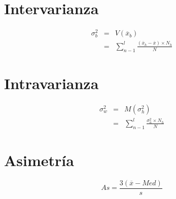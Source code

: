     \begin{minipage}[b]{\textwidth}
    \begin{minipage}[b]{0.5 \textwidth}
\section{Intervarianza}
    \begin{eqnarray*}
 { \sigma  }_{ b }^{ 2 } & = & V\left( \overline { x } _{ b } \right) \\
                         & = & \sum _{ n-1 }^{ l }{ \frac { \left( \overline { x } _{ h }-\overline { x }  \right) \times { N_{ h } } }{ N }  } 
\end{eqnarray*}
    
    \end{minipage} \hfill 
    \begin{minipage}[b]{0.5 \textwidth}

\section{Intravarianza} 
    \begin{eqnarray*}
 { \sigma  }_{ w }^{ 2 } & = & M\left( { \sigma  }_{ h }^{ 2 } \right)  \\
                         & = & \sum _{ n-1 }^{ l }{ \frac { { \sigma  }_{ n }^{ 2 }\times { N_{ h } } }{ N }  }  
\end{eqnarray*}
    
    \end{minipage}
    \end{minipage}
    
\section{Asimetría}
$$ As=\frac { 3\left( \overline { x } - Med \right)  }{ s }  $$  
